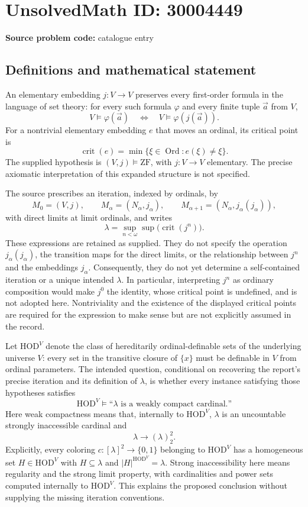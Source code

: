 \documentclass[11pt]{article}
\begin{document}
\section*{UnsolvedMath ID: 30004449}
\textbf{Source problem code:} catalogue entry
\subsection{Definitions and mathematical statement}
An elementary embedding \(j:V\to V\) preserves every first-order formula in the language of set theory: for every such formula \(\varphi\) and every finite tuple \(\vec a\) from \(V\),
\[
V\models\varphi(\vec a)\quad\Longleftrightarrow\quad V\models\varphi(j(\vec a)).
\]
For a nontrivial elementary embedding \(e\) that moves an ordinal, its critical point is
\[
\operatorname{crit}(e)=\min\{\xi\in\operatorname{Ord}:e(\xi)\ne\xi\}.
\]
The supplied hypothesis is \((V,j)\models\mathrm{ZF}\), with \(j:V\to V\) elementary. The precise axiomatic interpretation of this expanded structure is not specified.

The source prescribes an iteration, indexed by ordinals, by
\[
M_0=(V,j),\qquad M_\alpha=(N_\alpha,j_\alpha),\qquad
M_{\alpha+1}=(N_\alpha,j_\alpha(j_\alpha)),
\]
with direct limits at limit ordinals, and writes
\[
\lambda=\sup_{n<\omega}\sup\bigl(\operatorname{crit}(j^n)\bigr).
\]
These expressions are retained as supplied. They do not specify the operation \(j_\alpha(j_\alpha)\), the transition maps for the direct limits, or the relationship between \(j^n\) and the embeddings \(j_\alpha\). Consequently, they do not yet determine a self-contained iteration or a unique intended \(\lambda\). In particular, interpreting \(j^n\) as ordinary composition would make \(j^0\) the identity, whose critical point is undefined, and is not adopted here. Nontriviality and the existence of the displayed critical points are required for the expression to make sense but are not explicitly assumed in the record.

Let \(\mathrm{HOD}^{V}\) denote the class of hereditarily ordinal-definable sets of the underlying universe \(V\): every set in the transitive closure of \(\{x\}\) must be definable in \(V\) from ordinal parameters. The intended question, conditional on recovering the report's precise iteration and its definition of \(\lambda\), is whether every instance satisfying those hypotheses satisfies
\[
\mathrm{HOD}^{V}\models\text{``}\lambda\text{ is a weakly compact cardinal.''}
\]
Here weak compactness means that, internally to \(\mathrm{HOD}^{V}\), \(\lambda\) is an uncountable strongly inaccessible cardinal and
\[
\lambda\longrightarrow(\lambda)^2_2.
\]
Explicitly, every coloring \(c:[\lambda]^2\to\{0,1\}\) belonging to \(\mathrm{HOD}^{V}\) has a homogeneous set \(H\in\mathrm{HOD}^{V}\) with \(H\subseteq\lambda\) and \(|H|^{\mathrm{HOD}^{V}}=\lambda\). Strong inaccessibility here means regularity and the strong limit property, with cardinalities and power sets computed internally to \(\mathrm{HOD}^{V}\). This explains the proposed conclusion without supplying the missing iteration conventions.
\end{document}
